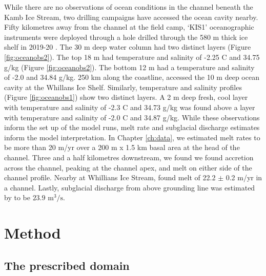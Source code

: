 While there are no observations of ocean conditions in the channel beneath the Kamb Ice Stream, two drilling campaigns have accessed the ocean cavity nearby. 
Fifty kilometres away from the channel at the field camp, `KIS1' oceanographic instruments were deployed through a hole drilled through the 580 m thick ice shelf in 2019-20 \citep{robinson2020ice}. The 30 m deep water column had two distinct layers (Figure \ref{fig:oceanobs2}). The top 18 m had temperature and salinity of -2.25 \textdegree C and  34.75 g/kg (Figure \ref{fig:oceanobs2}). The bottom 12 m had a temperature and salinity of -2.0 and 34.84 g/kg.
250 km along the coastline, \cite{begeman2018ocean} accessed the 10 m deep ocean cavity at the Whillans Ice Shelf. Similarly, temperature and salinity profiles (Figure \ref{fig:oceanobs1}) show two distinct layers. A 2 m deep fresh, cool layer with temperature and salinity of -2.3 \textdegree C and 34.73 g/kg was found above a layer with temperature and salinity of -2.0 \textdegree C and 34.87 g/kg.
While these observations inform the set up of the model runs, melt rate and subglacial discharge estimates inform the model interpretation.
In Chapter \ref{ch:data}, we estimated melt rates to be more than 20 m/yr over a 200 m x 1.5 km basal area at the head of the channel. Three and a half kilometres downstream, we found we found accretion across the channel, peaking at the channel apex, and melt on either side of the channel profile. Nearby at Whillians Ice Stream, \cite{marsh2016high} found melt of 22.2 $\pm$ 0.2 m/yr in a channel. Lastly, subglacial discharge from above grounding line was estimated by \cite{le2009subglacial} to be $23.9$ $\mathrm{m}^3/\mathrm{s}$.


\section{Method}

\subsection{The prescribed domain} \label{sec:domain}


